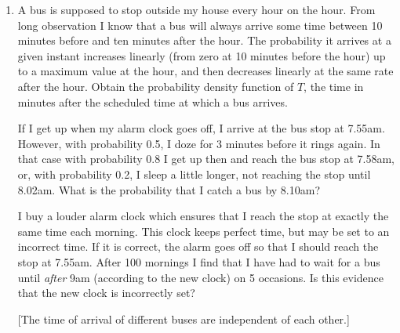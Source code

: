 \documentclass[a4, 11pt]{report}
\newlength{\qspace}
\newcounter{qnumber}
\newenvironment{question}%
 {\vspace{\qspace}
  \begin{enumerate}[\bfseries 1\quad][10]%
    \setcounter{enumi}{\value{qnumber}}%
    \item%
 }
{
  \end{enumerate}
  \filbreak
  \stepcounter{qnumber}
 }
\begin{document}
\begin{question}
A bus is supposed to stop outside my house every hour on the hour.
From long observation I know that a bus will always arrive some time
between 10 minutes before and ten minutes after the hour. The probability
it arrives at a given instant increases linearly (from zero at 10
minutes before the hour) up to a maximum value at the hour, and then
decreases linearly at the same rate after the hour. Obtain the probability
density function of $T$, the time in minutes after the scheduled
time at which a bus arrives. 


If I get up when my alarm clock goes off, I arrive at the bus stop
at 7.55am. However, with probability 0.5, I doze for 3 minutes before
it rings again. In that case with probability 0.8 I get up then and
reach the bus stop at 7.58am, or, with probability 0.2, I sleep a
little longer, not reaching the stop until 8.02am. What is the probability
that I catch a bus by 8.10am? 


I buy a louder alarm clock which ensures that I reach the stop at
exactly the same time each morning. This clock keeps perfect time,
but may be set to an incorrect time. If it is correct, the alarm goes
off so that I should reach the stop at 7.55am. After 100 mornings
I find that I have had to wait for a bus until \textit{after }9am
(according to the new clock) on 5 occasions. Is this evidence that
the new clock is incorrectly set? 


{[}The time of arrival of different buses are independent of each
other.{]} 
\end{question}
\end{document}
